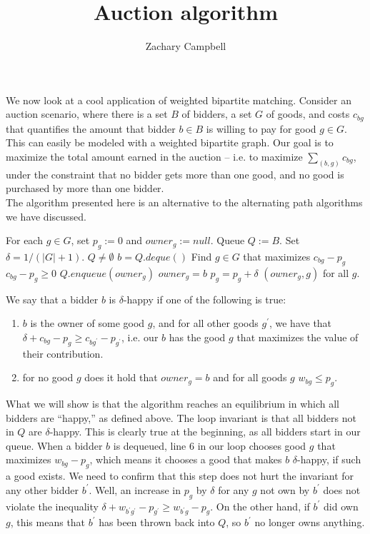\documentclass[11pt]{article}
\renewcommand{\'}{^{'}}
\renewcommand{\gets}{:=}
\newenvironment{definition}[2][Definition]{\begin{trivlist}
\item[\hskip \labelsep {\bfseries #1}\hskip \labelsep {\bfseries #2.}]}{\end{trivlist}}
\begin{document}
\title{Auction algorithm}
\author{Zachary Campbell}

\maketitle
\doublespacing
We now look at a cool application of weighted bipartite matching. Consider an auction scenario, where 
there is a set $B$ of bidders, a set $G$ of goods, and costs $c_{bg}$ that quantifies the amount 
that bidder $b\in B$ is willing to pay for good $g\in G$. This can easily be modeled with a 
weighted bipartite graph. Our goal is to maximize the total amount earned in the auction -- i.e. to 
maximize $\sum_{(b,g)} c_{bg}$, under the constraint that no bidder gets more than one good, and no 
good is purchased by more than one bidder. \\
The algorithm presented here is an alternative to the alternating path algorithms we have discussed. 
\singlespace
\begin{codebox}
	\li For each $g\in G$, set $p_g \gets 0$ and $owner_g \gets null$.
	\li Queue $Q \gets B$.
	\li Set $\delta = 1/(|G| + 1)$.
	\li \While $Q\neq \emptyset$
		\Do
	\li		$b = Q.deque()$
	\li		Find $g\in G$ that maximizes $c_{bg} - p_{g}$
	\li		\If $c_{bg} - p_{g} \geq 0$
				\Then
	\li				$Q.enqueue(owner_g)$
	\li				$owner_g = b$
	\li				$p_g = p_g + \delta$
				\End
		\End
	\li \Return $(owner_g,g)$ for all $g$.
\end{codebox}
\doublespacing
\begin{definition}{}
	We say that a bidder $b$ is $\delta$-happy if one of the following is true:
	\begin{enumerate}
		\item $b$ is the owner of some good $g$, and for all other goods $g\'$, we have that 
			$\delta + c_{bg} - p_g \geq c_{bg\'} - p_{g\'}$, i.e. our $b$ has the good $g$ 
			that maximizes the value of their contribution.
		\item for no good $g$ does it hold that $owner_g = b$ and for all goods $g$ 
			$w_{bg} \leq p_g$.
	\end{enumerate}
\end{definition}

What we will show is that the algorithm reaches an equilibrium in which all bidders are ``happy,'' as 
defined above. The loop invariant is that all bidders not in $Q$ are $\delta$-happy. This is 
clearly true at the beginning, as all bidders start in our queue. When a bidder $b$ is dequeued, 
line $6$ in our loop chooses good $g$ that maximizes $w_{bg} - p_g$, which means it chooses a good 
that makes $b$ $\delta$-happy, if such a good exists. We need to confirm that this step does not 
hurt the invariant for any other bidder $b\'$. Well, an increase in $p_g$ by $\delta$ for any $g$ 
not own by $b\'$ does not violate the inequality $\delta + w_{b\' g\'} - p_{g\'} \geq w_{b\' g} - p_g$. 
On the other hand, if $b\'$ did own $g$, this means that $b\'$ has been thrown back into $Q$, so $b\'$ 
no longer owns anything.
\end{document}
